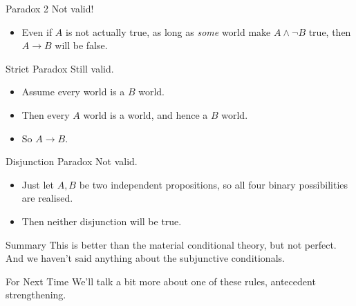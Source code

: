\documentclass[
  ignorenonframetext,
]{beamer}
\providecommand{\tightlist}{%
  \setlength{\itemsep}{0pt}\setlength{\parskip}{0pt}}
\renewcommand{\,}{\text{, }}
\begin{document}
\begin{frame}{Paradox 2}
\protect\hypertarget{paradox-2}{}
Not valid!

\begin{itemize}
\tightlist
\item
  Even if \(A\) is not actually true, as long as \emph{some} world make
  \(A \wedge \neg B\) true, then \(A \rightarrow B\) will be false.
\end{itemize}
\end{frame}

\begin{frame}{Strict Paradox}
\protect\hypertarget{strict-paradox}{}
Still valid.

\begin{itemize}
\tightlist
\item
  Assume every world is a \(B\) world.
\item
  Then every \(A\) world is a world, and hence a \(B\) world.
\item
  So \(A \rightarrow B\).
\end{itemize}
\end{frame}

\begin{frame}{Disjunction Paradox}
\protect\hypertarget{disjunction-paradox}{}
Not valid.

\begin{itemize}
\tightlist
\item
  Just let \(A, B\) be two independent propositions, so all four binary
  possibilities are realised.
\item
  Then neither disjunction will be true.
\end{itemize}
\end{frame}

\begin{frame}{Summary}
\protect\hypertarget{summary}{}
This is better than the material conditional theory, but not perfect.
And we haven't said anything about the subjunctive conditionals.
\end{frame}

\begin{frame}{For Next Time}
\protect\hypertarget{for-next-time}{}
We'll talk a bit more about one of these rules, antecedent
strengthening.
\end{frame}
\end{document}
